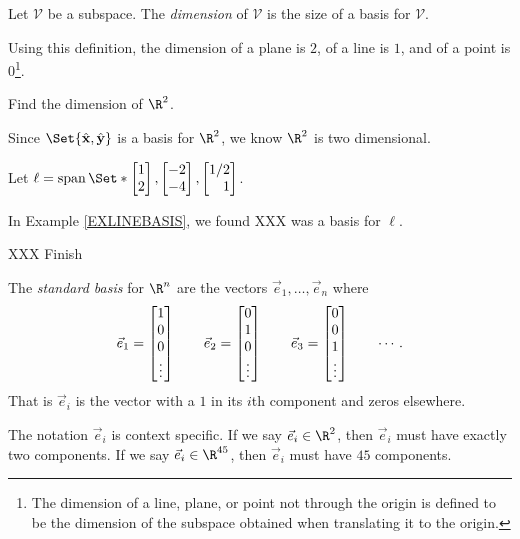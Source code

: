 	\begin{definition}[Dimension]
		Let $\mathcal V$ be a subspace. The \emph{dimension} of $\mathcal V$
		is the size of a basis for $\mathcal V$.
	\end{definition}

	Using this definition, the dimension of a plane is $2$, of a line is $1$,
	and of a point is $0$\footnote{ The dimension of a line, plane, or point
	not through the origin is defined to be the dimension of the subspace obtained
	when translating it to the origin.}.

	\begin{example}
		Find the dimension of $\R^2$.

		Since $\Set{\xhat, \yhat}$ is a basis for $\R^2$, we know $\R^2$ is
		two dimensional.
	\end{example}

	\begin{example}
		Let $\ell=\Span\Set*{\mat{1\\2},\mat{-2\\-4}, \mat{1/2\\1}}$.

		In Example \ref{EXLINEBASIS}, we found XXX was a basis for $\ell$.

		XXX Finish
	\end{example}

	\begin{definition}
		The \emph{standard basis} for $\R^n$ are the 
		vectors $\vec e_1,\ldots,\vec e_n$ where
		\[
			\vec e_1=\begin{bmatrix}1\\0\\0\\\vdots\end{bmatrix}\qquad
			\vec e_2=\begin{bmatrix}0\\1\\0\\\vdots\end{bmatrix}\qquad
			\vec e_3=\begin{bmatrix}0\\0\\1\\\vdots\end{bmatrix}\qquad\cdots.
		\]
		That is $\vec e_i$ is the vector with a $1$ in its
		$i$th component and zeros elsewhere.
	\end{definition}

	The notation $\vec e_i$ is context specific. If we say $\vec e_i\in\R^2$,
	then $\vec e_i$ must have exactly two components. If we say $\vec e_i\in\R^{45}$,
	then $\vec e_i$ must have $45$ components. 
